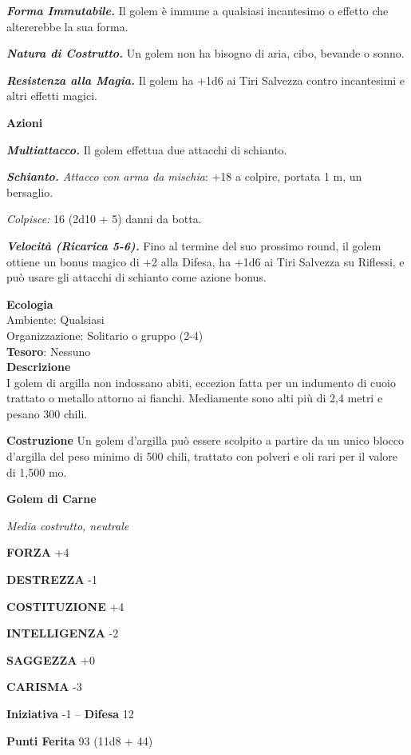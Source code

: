 \begin{multicols}{2}
\textit{\textbf{Forma Immutabile.}} Il golem è immune a qualsiasi incantesimo o effetto che altererebbe la sua forma.

\textit{\textbf{Natura di Costrutto.}} Un golem non ha bisogno di aria, cibo, bevande o sonno.

\textit{\textbf{Resistenza alla Magia.}} Il golem ha +1d6 ai Tiri Salvezza contro incantesimi e altri effetti magici.

\textbf{Azioni}

\textit{\textbf{Multiattacco.}} Il golem effettua due attacchi di schianto.

\textit{\textbf{Schianto.} Attacco con arma da mischia}: +18 a colpire, portata 1 m, un bersaglio.

\textit{Colpisce:} 16 (2d10 + 5) danni da botta.

\textit{\textbf{Velocità (Ricarica 5-6).}} Fino al termine del suo prossimo round, il golem ottiene un bonus magico di +2 alla Difesa, ha +1d6 ai Tiri Salvezza su Riflessi, e può usare gli attacchi di schianto come azione bonus.

\textbf{Ecologia}\\
Ambiente: Qualsiasi\\
Organizzazione: Solitario o gruppo (2-4)\\
\textbf{Tesoro}: Nessuno\\
\textbf{Descrizione}\\
I golem di argilla non indossano abiti, eccezion fatta per un indumento di cuoio trattato o metallo attorno ai fianchi. Mediamente sono alti più di 2,4 metri e pesano 300 chili.

\textbf{Costruzione}
Un golem d'argilla può essere scolpito a partire da un unico blocco d'argilla del peso minimo di 500 chili, trattato con polveri e oli rari per il valore di 1,500 mo.


\medskip{}\textbf{Golem di Carne}

\textit{Media costrutto, neutrale}

\textbf{FORZA} +4

\textbf{DESTREZZA} -1

\textbf{COSTITUZIONE} +4

\textbf{INTELLIGENZA} -2

\textbf{SAGGEZZA} +0

\textbf{CARISMA} -3

\textbf{Iniziativa} -1 -- \textbf{Difesa} 12

\textbf{Punti Ferita} 93 (11d8 + 44)


\end{multicols}

